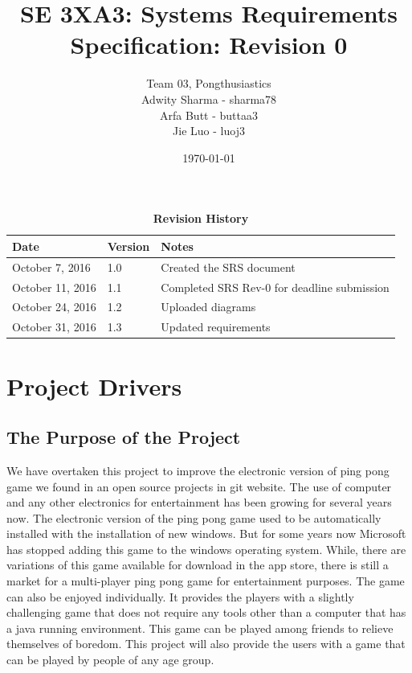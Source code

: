 \documentclass[12pt,letterpaper]{article}
\title{SE 3XA3: Systems Requirements Specification: Revision 0}
\author{Team 03, Pongthusiastics 		
\\ Adwity Sharma - sharma78 		
\\ Arfa Butt - buttaa3 	
\\ Jie Luo - luoj3 }
\date{\today}
\begin{document}
\maketitle
\newpage
\tableofcontents

\listoftables
\listoffigures
\begin{table}[h]
\caption{\bf Revision History}
\begin{tabularx}{\textwidth}{p{3.5cm}p{2cm}X}
\toprule {\bf Date} & {\bf Version} & {\bf Notes}\\
\midrule
October 7, 2016 & 1.0 & Created the SRS document \\
October 11, 2016 & 1.1 & Completed SRS Rev-0 for deadline submission\\
October 24, 2016 & 1.2 & Uploaded diagrams \\
October 31, 2016 & 1.3 & Updated requirements \\

\bottomrule
\end{tabularx}
\end{table}

\newpage


	
	\section{Project Drivers}
	\subsection{The Purpose of the Project}
	We have overtaken this project to improve the electronic version of ping pong game we found in an open source projects in git website. The use of computer and any other electronics for entertainment has been growing for several years now. The electronic version of the ping pong game used to be automatically installed with the installation of new windows. But for some years now Microsoft has stopped adding this game to the windows operating system. While, there are variations of this game available for download in the app store, there is still a market for a multi-player ping pong game for entertainment purposes. The game can also be enjoyed individually. It provides the players with a slightly challenging game that does not require any tools other than a computer that has a java running environment. This game can be played among friends to relieve themselves of boredom. This project will also provide the users with a game that can be played by people of any age group. \\
\end{document}
